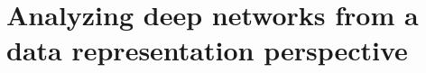 \documentclass[
	a4paper,
	twoside,	%
	openright,  %
	chapterprefix=false,
	11pt,
	headings=big,
	draft=false,
	oldfontcommands]{memoir}
\def\TikzLocation{../tikz/}
\def\crossref{}
\begin{document}
\def\biblio{}
\def\cbiblio{}
\def\crossref{}
\def\TikzLocation{./tikz/}


\setcounter{chapter}{5}

\part{Analyzing deep networks from a data representation perspective}
\label{part2}









\end{document}
